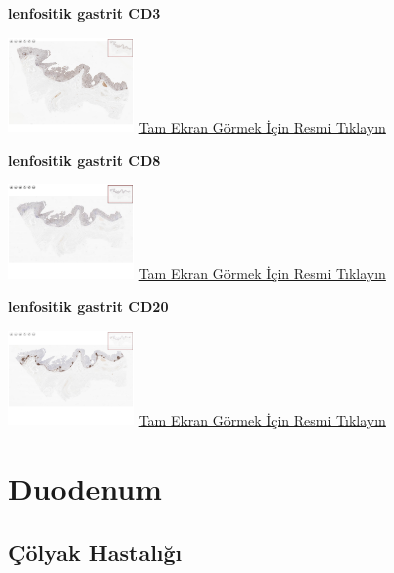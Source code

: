 \documentclass[
  letterpaper,
  DIV=11,
  numbers=noendperiod]{scrreprt}
\begin{document}
\textbf{lenfositik gastrit CD3}

\href{https://images.patolojiatlasi.com/lymphocytic-gastritis/CD3.html}{\includegraphics[width=0.25\textwidth,height=\textheight]{./screenshots/lymphocytic-gastritisCD3_screenshot.png}}
\href{https://images.patolojiatlasi.com/lymphocytic-gastritis/CD3.html}{Tam
Ekran Görmek İçin Resmi Tıklayın}

\textbf{lenfositik gastrit CD8}

\href{https://images.patolojiatlasi.com/lymphocytic-gastritis/CD8.html}{\includegraphics[width=0.25\textwidth,height=\textheight]{./screenshots/lymphocytic-gastritisCD8_screenshot.png}}
\href{https://images.patolojiatlasi.com/lymphocytic-gastritis/CD8.html}{Tam
Ekran Görmek İçin Resmi Tıklayın}

\textbf{lenfositik gastrit CD20}

\href{https://images.patolojiatlasi.com/lymphocytic-gastritis/CD20.html}{\includegraphics[width=0.25\textwidth,height=\textheight]{./screenshots/lymphocytic-gastritisCD20_screenshot.png}}
\href{https://images.patolojiatlasi.com/lymphocytic-gastritis/CD20.html}{Tam
Ekran Görmek İçin Resmi Tıklayın}

\hypertarget{sec-duodenum}{%
\chapter{Duodenum}\label{sec-duodenum}}

\hypertarget{sec-colyak-hastaligi}{%
\section{Çölyak Hastalığı}\label{sec-colyak-hastaligi}}
\end{document}
